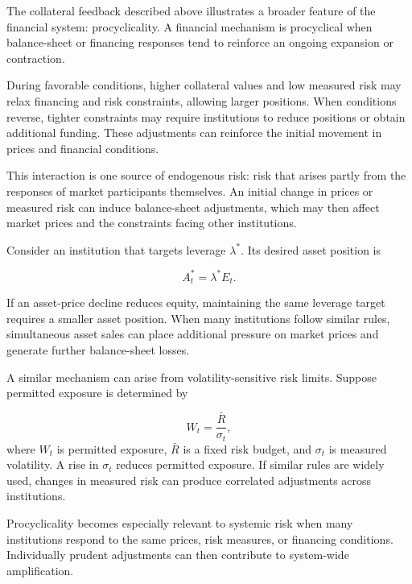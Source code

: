 The collateral feedback described above illustrates a broader feature of the financial system: procyclicality. A financial mechanism is procyclical when balance-sheet or financing responses tend to reinforce an ongoing expansion or contraction.

During favorable conditions, higher collateral values and low measured risk may relax financing and risk constraints, allowing larger positions. When conditions reverse, tighter constraints may require institutions to reduce positions or obtain additional funding. These adjustments can reinforce the initial movement in prices and financial conditions.

This interaction is one source of endogenous risk: risk that arises partly from the responses of market participants themselves. An initial change in prices or measured risk can induce balance-sheet adjustments, which may then affect market prices and the constraints facing other institutions.

Consider an institution that targets leverage \(\lambda^{*}\). Its desired asset position is

\begin{equation}
A_t^{*}
=
\lambda^{*}E_t.
\label{eq:ch21-target-assets}
\end{equation}

If an asset-price decline reduces equity, maintaining the same leverage target requires a smaller asset position. When many institutions follow similar rules, simultaneous asset sales can place additional pressure on market prices and generate further balance-sheet losses.

A similar mechanism can arise from volatility-sensitive risk limits. Suppose permitted exposure is determined by

\begin{equation}
W_t
=
\frac{\bar{R}}{\sigma_t},
\label{eq:ch21-volatility-sensitive-position}
\end{equation}
where \(W_t\) is permitted exposure, \(\bar{R}\) is a fixed risk budget, and \(\sigma_t\) is measured volatility. A rise in \(\sigma_t\) reduces permitted exposure. If similar rules are widely used, changes in measured risk can produce correlated adjustments across institutions.

Procyclicality becomes especially relevant to systemic risk when many institutions respond to the same prices, risk measures, or financing conditions. Individually prudent adjustments can then contribute to system-wide amplification.


